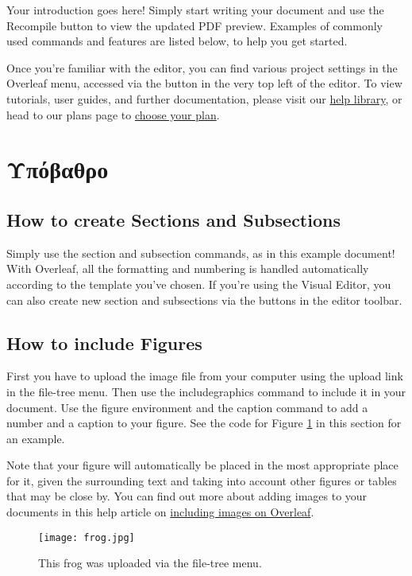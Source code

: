 \documentclass{article}
\begin{document}
Your introduction goes here! Simply start writing your document and use the Recompile button to view the updated PDF preview. Examples of commonly used commands and features are listed below, to help you get started.

Once you're familiar with the editor, you can find various project settings in the Overleaf menu, accessed via the button in the very top left of the editor. To view tutorials, user guides, and further documentation, please visit our \href{https://www.overleaf.com/learn}{help library}, or head to our plans page to \href{https://www.overleaf.com/user/subscription/plans}{choose your plan}.

\section{Υπόβαθρο}

\subsection{How to create Sections and Subsections}

Simply use the section and subsection commands, as in this example document! With Overleaf, all the formatting and numbering is handled automatically according to the template you've chosen. If you're using the Visual Editor, you can also create new section and subsections via the buttons in the editor toolbar.

\subsection{How to include Figures}

First you have to upload the image file from your computer using the upload link in the file-tree menu. Then use the includegraphics command to include it in your document. Use the figure environment and the caption command to add a number and a caption to your figure. See the code for Figure \ref{fig:frog} in this section for an example.

Note that your figure will automatically be placed in the most appropriate place for it, given the surrounding text and taking into account other figures or tables that may be close by. You can find out more about adding images to your documents in this help article on \href{https://www.overleaf.com/learn/how-to/Including_images_on_Overleaf}{including images on Overleaf}.

\begin{figure}
\centering
\texttt{[image: frog.jpg]}
\caption{\label{fig:frog}This frog was uploaded via the file-tree menu.}
\end{figure}
\end{document}
